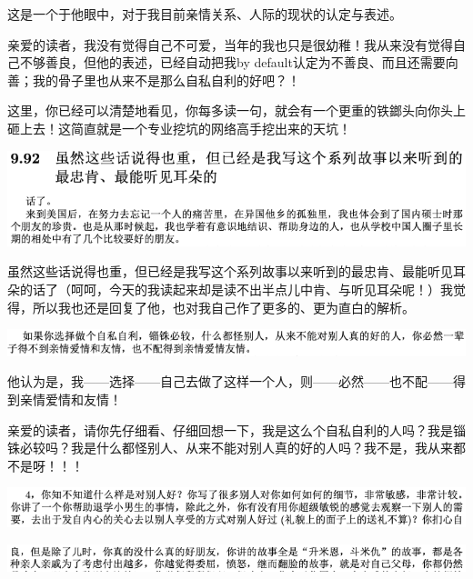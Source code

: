 \documentclass[9pt, b5paper]{article}
\begin{document}
这是一个于他眼中，对于我目前亲情关系、人际的现状的认定与表述。

亲爱的读者，我没有觉得自己不可爱，当年的我也只是很幼稚！我从来没有觉得自己不够善良，但他的表述，已经自动把我by default认定为不善良、而且还需要向善；我的骨子里也从来不是那么自私自利的好吧？！

这里，你已经可以清楚地看见，你每多读一句，就会有一个更重的铁鎯头向你头上砸上去！这简直就是一个专业挖坑的网络高手挖出来的天坑！

\begin{center}
\includegraphics[width=.9\linewidth]{./pic/backups_plans_20210413_140845.png}
\end{center}

虽然这些话说得也重，但已经是我写这个系列故事以来听到的最忠肯、最能听见耳朵的话了（呵呵，今天的我读起来却是读不出半点儿中肯、与听见耳朵呢！）我觉得，所以我也还是回复了他，也对我自己作了更多的、更为直白的解析。

\begin{center}
\includegraphics[width=.9\linewidth]{./pic/backups_plans_20210413_131134.png}
\end{center}

他认为是，我——选择——自己去做了这样一个人，则——必然——也不配——得到亲情爱情和友情！

亲爱的读者，请你先仔细看、仔细回想一下，我是这么个自私自利的人吗？我是锱铢必较吗？我是什么都怪别人、从来不能对别人真的好的人吗？我不是，我从来都不是呀！！！

\begin{center}
\includegraphics[width=.9\linewidth]{./pic/backups_plans_20210413_142517.png}
\end{center}

\begin{center}
\includegraphics[width=.9\linewidth]{./pic/backups_plans_20210413_143045.png}
\end{center}
\end{document}
